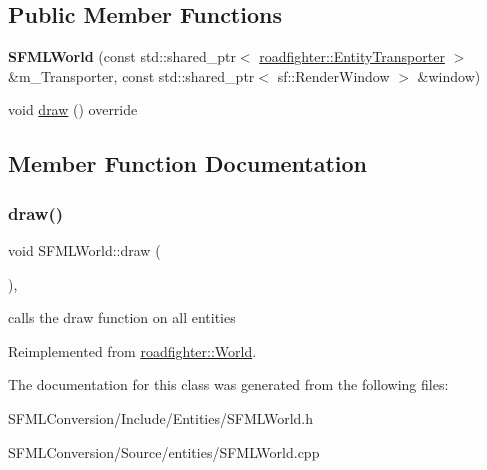 \subsection*{Public Member Functions}
\begin{DoxyCompactItemize}
\item 
\mbox{\label{classSFMLWorld_a44e744c66e65d0cff6a76b68f281f566}} 
{\bfseries S\+F\+M\+L\+World} (const std\+::shared\+\_\+ptr$<$ \hyperlink{classroadfighter_1_1EntityTransporter}{roadfighter\+::\+Entity\+Transporter} $>$ \&m\+\_\+\+Transporter, const std\+::shared\+\_\+ptr$<$ sf\+::\+Render\+Window $>$ \&window)
\item 
void \hyperlink{classSFMLWorld_aa0e1deda989ca494937054c5f5b139b0}{draw} () override
\end{DoxyCompactItemize}


\subsection{Member Function Documentation}
\mbox{\label{classSFMLWorld_aa0e1deda989ca494937054c5f5b139b0}} 
\subsubsection{\texorpdfstring{draw()}{draw()}}
{\footnotesize\ttfamily void S\+F\+M\+L\+World\+::draw (\begin{DoxyParamCaption}{ }\end{DoxyParamCaption})\hspace{0.3cm}{\ttfamily [override]}, {\ttfamily [virtual]}}

calls the draw function on all entities 

Reimplemented from \hyperlink{classroadfighter_1_1World_a90534263a154d6d7c1e8aef4e0138881}{roadfighter\+::\+World}.



The documentation for this class was generated from the following files\+:\begin{DoxyCompactItemize}
\item 
S\+F\+M\+L\+Conversion/\+Include/\+Entities/S\+F\+M\+L\+World.\+h\item 
S\+F\+M\+L\+Conversion/\+Source/entities/S\+F\+M\+L\+World.\+cpp\end{DoxyCompactItemize}
